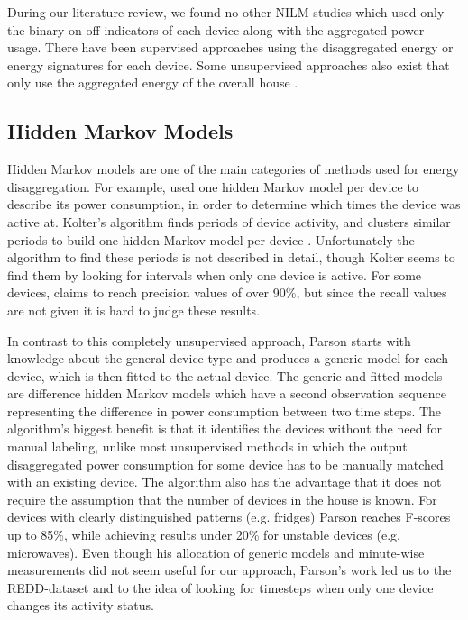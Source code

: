 \documentclass{article}
\begin{document}
During our literature review, we found no other NILM studies which used only the binary on-off indicators of each device along with the aggregated power usage.
There have been supervised approaches using the disaggregated energy\cite{Kelly} or energy signatures \cite{Parson} for each device.
Some unsupervised approaches also exist that only use the aggregated energy of the overall house \cite{Kolter}.

\subsection{Hidden Markov Models}
Hidden Markov models are one of the main categories of methods used for energy disaggregation.
For example, \cite{Kolter} used one hidden Markov model per device to describe its power consumption, in order to determine which times the device was active at.
Kolter's algorithm finds periods of device activity, and clusters similar periods to build one hidden Markov model per device \cite{Kolter}.
Unfortunately the algorithm to find these periods is not described in detail, though Kolter seems to find them by looking for intervals when only one device is active.
For some devices, \cite{Kolter} claims to reach precision values of over 90\%, but since the recall values are not given it is hard to judge these results.

In contrast to this completely unsupervised approach, Parson starts with knowledge about the general device type and produces a generic model for each device, which is then fitted to the actual device.
The generic and fitted models are difference hidden Markov models which have a second observation sequence representing the difference in power consumption between two time steps.
The algorithm's biggest benefit is that it identifies the devices without the need for manual labeling, unlike most unsupervised methods in which the output disaggregated power consumption for some device has to be manually matched with an existing device.
The algorithm also has the advantage that it does not require the assumption that the number of devices in the house is known.
For devices with clearly distinguished patterns (e.g. fridges) Parson reaches F-scores up to 85\%, while achieving results under 20\% for unstable devices (e.g. microwaves).
Even though his allocation of generic models and minute-wise measurements did not seem useful for our approach, Parson's work led us to the REDD-dataset and to the idea of looking for timesteps when only one device changes its activity status.
\end{document}
